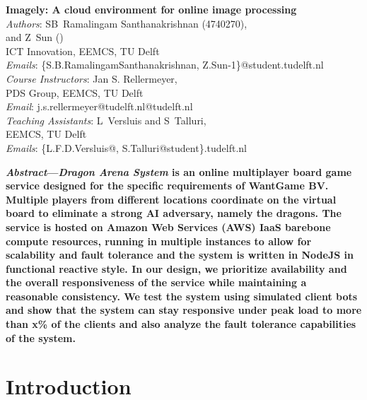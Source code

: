\documentclass[a4paper]{IEEEtran}
\begin{document}
  
  \setlength{\tabcolsep}{10pt}
  \renewcommand{\arraystretch}{1.25}
  
  \begin{center}
    \textbf{\Large{
      Imagely: A cloud environment for online image processing
    }}\\
    \vspace{0.25cm}
    \emph{Authors}: SB~Ramalingam Santhanakrishnan (4740270), \\ and Z~Sun () \\
    ICT Innovation, EEMCS, TU Delft\\
    \emph{Emails}: \{S.B.RamalingamSanthanakrishnan, Z.Sun-1\}@student.tudelft.nl\\
    \vspace{0.2cm}
    \emph{Course Instructors}: Jan S. Rellermeyer,\\
    PDS Group, EEMCS, TU Delft\\
    \emph{Email}: j.s.rellermeyer@tudelft.nl@tudelft.nl\\
    \vspace{0.2cm}
    \emph{Teaching Assistants}: L~Versluis and S~Talluri,\\
    EEMCS, TU Delft\\
    \emph{Emails}: {\{L.F.D.Versluis@, S.Talluri@student\}.tudelft.nl}\\
  \end{center}
  
  \vspace{0.2cm}
  
  \textbf{
    \emph{Abstract}---\emph{Dragon Arena System} is an online multiplayer board game service designed for the specific requirements of WantGame BV. Multiple players from different locations coordinate on the virtual board to eliminate a strong AI adversary, namely the dragons. The service is hosted on Amazon Web Services (AWS) IaaS barebone compute resources, running in multiple instances to allow for scalability and fault tolerance and the system is written in NodeJS in functional reactive style. In our design, we prioritize availability and the overall responsiveness of the service while maintaining a reasonable consistency. We test the system using simulated client bots and show that the system can stay responsive under peak load to more than x\% of the clients and also analyze the fault tolerance capabilities of the system. 
  }
  
  \section{Introduction}
  
\end{document}
